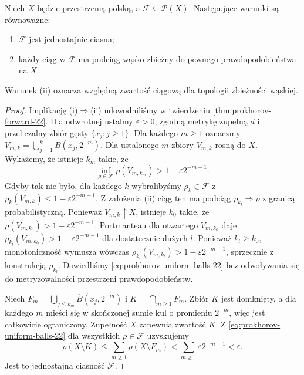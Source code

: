 \begin{twierdzenie}
\label{thm:prokhorov-22}
Niech $X$ będzie przestrzenią polską, a
$\mathcal F\subseteq\mathcal P(X)$.
Następujące warunki są równoważne:
\begin{enumerate}[label=(\roman*)]
\item $\mathcal F$ jest jednostajnie ciasna;
\item każdy ciąg w $\mathcal F$ ma podciąg wąsko
zbieżny do pewnego prawdopodobieństwa na $X$.
\end{enumerate}
Warunek (ii) oznacza względną zwartość
ciągową dla topologii zbieżności wąskiej.
\end{twierdzenie}
\begin{proof}
Implikację (i)$\Rightarrow$(ii) udowodniliśmy w twierdzeniu
\ref{thm:prokhorov-forward-22}. Dla odwrotnej
ustalmy $\varepsilon>0$, zgodną metrykę zupełną $d$
i przeliczalny zbiór gęsty $\{x_j:j\ge1\}$.
Dla każdego $m\ge1$ oznaczmy
$V_{m,k}=\bigcup_{j=1}^k B(x_j,2^{-m})$.
Dla ustalonego $m$ zbiory $V_{m,k}$ rosną do $X$.
Wykażemy, że istnieje $k_m$ takie, że
\begin{equation}\label{eq:prokhorov-uniform-balls-22}
\inf_{\rho\in\mathcal F}\rho(V_{m,k_m})
>1-\varepsilon2^{-m-1}.
\end{equation}
Gdyby tak nie było, dla każdego $k$ wybralibyśmy
$\rho_k\in\mathcal F$ z
$\rho_k(V_{m,k})\le1-\varepsilon2^{-m-1}$.
Z założenia (ii) ciąg ten ma podciąg
$\rho_{k_l}\Rightarrow\rho$ z granicą probabilistyczną.
Ponieważ $V_{m,k}\uparrow X$, istnieje $k_0$ takie,
że $\rho(V_{m,k_0})>1-\varepsilon2^{-m-1}$.
Portmanteau dla otwartego $V_{m,k_0}$ daje
$\rho_{k_l}(V_{m,k_0})>1-\varepsilon2^{-m-1}$
dla dostatecznie dużych $l$. Ponieważ $k_l\ge k_0$,
monotoniczność wymusza wówczas
$\rho_{k_l}(V_{m,k_l})>1-\varepsilon2^{-m-1}$,
sprzecznie z konstrukcją $\rho_{k_l}$.
Dowiedliśmy \eqref{eq:prokhorov-uniform-balls-22}
bez odwoływania się do metryzowalności
przestrzeni prawdopodobieństw.

Niech $F_m=\bigcup_{j\le k_m}\overline B(x_j,2^{-m})$
i $K=\bigcap_{m\ge1}F_m$. Zbiór $K$ jest domknięty,
a dla każdego $m$ mieści się w skończonej sumie kul
o promieniu $2^{-m}$, więc jest całkowicie ograniczony.
Zupełność $X$ zapewnia zwartość $K$.
Z \eqref{eq:prokhorov-uniform-balls-22} dla wszystkich
$\rho\in\mathcal F$ uzyskujemy
\[
 \rho(X\setminus K)\le\sum_{m\ge1}\rho(X\setminus F_m)
 <\sum_{m\ge1}\varepsilon2^{-m-1}<\varepsilon.
\]
Jest to jednostajna ciasność $\mathcal F$.
\end{proof}

